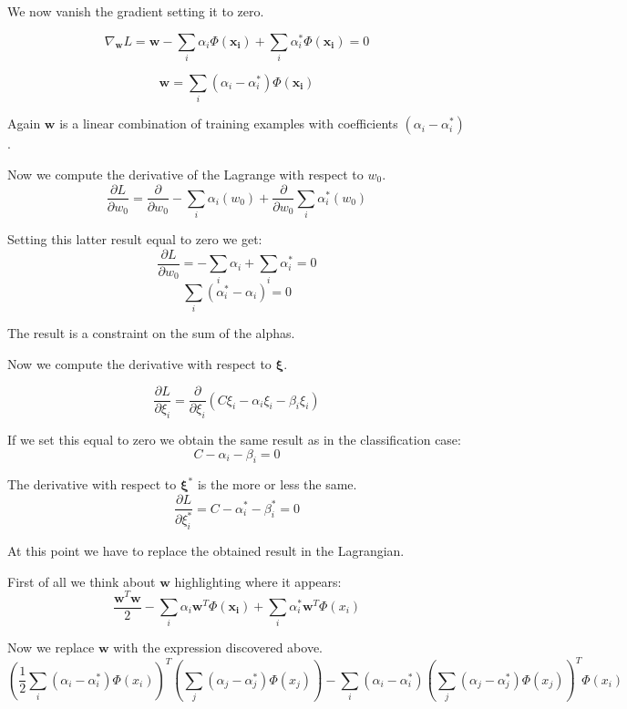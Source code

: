 We now vanish the gradient setting it to zero.

\[
	\nabla_{\pmb{w}}L = \pmb{w}- \sum_{i}\alpha_{i}\Phi(\pmb{x_i}) + \sum_{i}\alpha
	_{i}^{*}\Phi(\pmb{x_i}) = 0
\]

\[
	\pmb{w}= \sum_{i}(\alpha_{i}-\alpha_{i}^{*}) \Phi(\pmb{x_i})
\]

Again $\pmb{w}$ is a linear combination of training examples with coefficients $(
\alpha_{i}- \alpha_{i}^{*})$.
\newline

Now we compute the derivative of the Lagrange with respect to $w_{0}$.
\[
	\frac{\partial L}{\partial w_{0}}= \frac{\partial}{\partial w_{0}}- \sum_{i}\alpha
	_{i}(w_{0}) + \frac{\partial}{\partial w_{0}}\sum_{i}\alpha_{i}^{*}(w_{0})
\]

Setting this latter result equal to zero we get:
\[
	\frac{\partial L}{\partial w_{0}}= - \sum_{i}\alpha_{i}+ \sum_{i}\alpha_{i}^{*}
	= 0
\]
\[
	\sum_{i}(\alpha_{i}^{*}- \alpha_{i}) = 0
\]

The result is a constraint on the sum of the alphas.
\newline

Now we compute the derivative with respect to $\pmb{\xi}$.

\[
	\frac{\partial L}{\partial \xi_{i}}= \frac{\partial }{\partial \xi_{i}}(C \xi_{i}
	- \alpha_{i}\xi_{i}- \beta_{i}\xi_{i})
\]

If we set this equal to zero we obtain the same result as in the classification
case:
\[
	C - \alpha_{i}- \beta_{i}= 0
\]
\newline

The derivative with respect to $\pmb{\xi}^{*}$ is the more or less the same.
\[
	\frac{\partial L}{\partial \xi_{i}^{*}}= C - \alpha_{i}^{*}- \beta_{i}^{*}= 0
\]

At this point we have to replace the obtained result in the Lagrangian.
\newline

First of all we think about $\pmb{w}$ highlighting where it appears:
\[
	\frac{\pmb{w}^{T}\pmb{w}}{2}- \sum_{i}\alpha_{i}\pmb{w}^{T}\Phi(\pmb{x_i}) + \sum
	_{i}\alpha_{i}^{*}\pmb{w}^{T}\Phi(x_{i})
\]

Now we replace $\pmb{w}$ with the expression discovered above.
\[
	(\frac{1}{2}\sum_{i}(\alpha_{i}- \alpha_{i}^{*}) \Phi(x_{i}))^{T}(\sum_{j}( \alpha
	_{j}- \alpha_{j}^{*}) \Phi(x_{j})) - \sum_{i}(\alpha_{i}- \alpha_{i}^{*}) (\sum
	_{j}(\alpha_{j}- \alpha_{j}^{*}) \Phi(x_{j}))^{T}\Phi(x_{i})
\]

